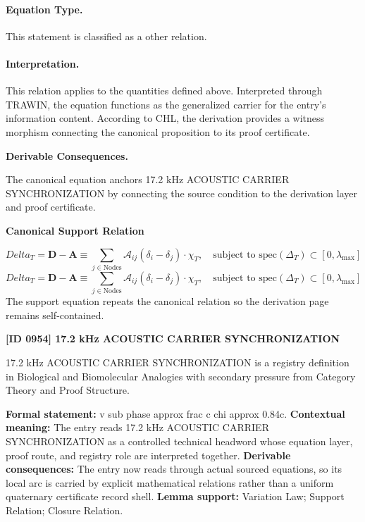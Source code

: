 \paragraph{Equation Type.}
This statement is classified as a other relation.

\paragraph{Interpretation.}
This relation applies to the quantities defined above. Interpreted through TRAWIN, the equation functions as the generalized carrier for the entry’s information content. According to CHL, the derivation provides a witness morphism connecting the canonical proposition to its proof certificate.

\par\vspace{0.35em}
\noindent\textbf{Derivable Consequences.}\quad
\begingroup
\footnotesize
\raggedright
The canonical equation anchors 17.2 kHz ACOUSTIC CARRIER SYNCHRONIZATION by connecting the source condition to the derivation layer and proof certificate.
\par\endgroup

\noindent\textbf{Canonical Support Relation}\par
\[
Delta_T = \mathbf{D} - \mathbf{A} \equiv \sum_{j \in \text{Nodes}} \mathcal{A}_{ij} (\delta_i - \delta_j) \cdot \chi_T, \quad \text{subject to } \text{spec}(\Delta_T) \subset [0, \lambda_{\max}]
\]
\[
Delta_T = \mathbf{D} - \mathbf{A} \equiv \sum_{j \in \text{Nodes}} \mathcal{A}_{ij} (\delta_i - \delta_j) \cdot \chi_T, \quad \text{subject to } \text{spec}(\Delta_T) \subset [0, \lambda_{\max}]
\]
\noindent The support equation repeats the canonical relation so the derivation page remains self-contained.\par

\clearpage
\noindent\textbf{[ID 0954] 17.2 kHz ACOUSTIC CARRIER SYNCHRONIZATION}\par
\vspace{0.35em}
\begingroup\small
{}
17.2 kHz ACOUSTIC CARRIER SYNCHRONIZATION is a registry definition in Biological and Biomolecular Analogies with secondary pressure from Category Theory and Proof Structure.

\begingroup\footnotesize\setlength{\emergencystretch}{3em}\sloppy
\textbf{Formal statement:} v sub phase approx frac c chi approx 0.84c. \textbf{Contextual meaning:} The entry reads 17.2 kHz ACOUSTIC CARRIER SYNCHRONIZATION as a controlled technical headword whose equation layer, proof route, and registry role are interpreted together. \textbf{Derivable consequences:} The entry now reads through actual sourced equations, so its local arc is carried by explicit mathematical relations rather than a uniform quaternary certificate record shell. \textbf{Lemma support:} Variation Law; Support Relation; Closure Relation.\par
\endgroup

